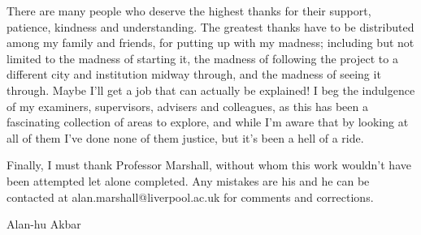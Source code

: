There are many people who deserve the highest thanks for their support, patience, kindness and understanding.
The greatest thanks have to be distributed among my family and friends, for putting up with my madness; including but not limited to the madness of starting it, the madness of following the project to a different city and institution midway through, and the madness of seeing it through.
Maybe I'll get a job that can actually be explained!
I beg the indulgence of my examiners, supervisors, advisers and colleagues, as this has been a fascinating collection of areas to explore, and while I'm aware that by looking at all of them I've done none of them justice, but it's been a hell of a ride.

Finally, I must thank Professor Marshall, without whom this work wouldn't have been attempted let alone completed.
Any mistakes are his and he can be contacted at alan.marshall@liverpool.ac.uk for comments and corrections.

{\centering
Alan-hu Akbar\par
}
